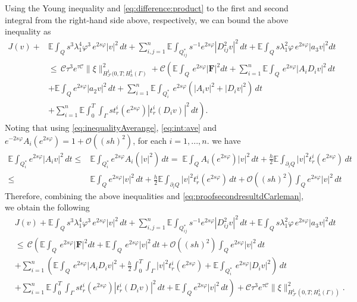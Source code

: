 \documentclass[11pt,oneside,leqno]{amsart}
\numberwithin{equation}{section}
\numberwithin{equation}{section}
\newcommand{\E}{\mathbb{E}}
\begin{document}
Using the Young inequality and \eqref{eq:difference:product} to the first and second integral from the right-hand side above, respectively, we can bound the above inequality as
\begin{equation}\label{eq:proofsecondresultdCarleman}
\begin{split}
J(v)+&\E\int_{Q}s^{3}\lambda^{4}_{1}\varphi^{3}\,e^{2s\varphi}|v|^{2}\,dt+\sum_{i,j=1}^{n}\E\int_{Q_{ij}^{\ast}}s^{-1}e^{2s\varphi}|D_{ij}^2v|^2\, dt+\E\int_{Q}s\lambda_{1}^2\varphi\,e^{2s\varphi}|a_3 v|^2dt\\
&\leq\,\mathcal{C}\tau^3e^{\tau\mathcal{C}}\|\xi\|^2_{H^1_{\mathcal{F}}(0,T;H_h^1(\Gamma)}+\mathcal{C}\left(\E\int_{Q}\,e^{2s\varphi}|\mathbf{F}|^2dt+\sum_{i=1}^{n}\E\int_{Q}\,e^{2s\varphi}|A_{i}D_{i}v|^2\,dt\right.\\
&\left.+\E\int_{Q}e^{2s\varphi}|a_2v|^2\,dt+\sum_{i=1}^{n}\E\int_{Q_i^{\ast}}\,e^{2s\varphi}\left(|A_{i}v|^2+|D_{i}v|^2\right)\,dt\right.\\
&\left.+\sum_{i=1}^{n}\E\int_0^T\int_{\Gamma}st_{r}^{i}(e^{2s\varphi})|t_{r}^{i}(D_iv)|^2\,dt\right).
\end{split}
\end{equation}
Noting that using \eqref{eq:inequalityAverange}, \eqref{eq:int:ave} and $e^{-2s\varphi}A_i(e^{2s\varphi})=1+\mathcal{O}((sh)^2)$, for each $i{ =1,...,n.}$ we have
\begin{equation*}
\begin{split}
\E\int_{Q_i^{\ast}}e^{2s\varphi}|A_{i}v|^2\,dt\leq& \E\int_{Q_i^{\ast}}e^{2s\varphi}A_i(|v|^2)\,dt=\; \E\int_{Q}A_i(e^{2s\varphi})|v|^2\,dt+\frac{h}{2}\E\int_{\partial_i Q} |v|^2t_r^{i}(e^{2s\varphi})\,dt\\
\leq&\E\int_{Q}e^{2s\varphi}|v|^2\,dt+\frac{h}{2}\E\int_{\partial_i Q} |v|^2t_r^{i}(e^{2s\varphi})\,dt+\mathcal{O}((sh)^2)\int_{Q}e^{2s\varphi}|v|^2\,dt
\end{split}
\end{equation*}
Therefore, combining the above inequalities and \eqref{eq:proofsecondresultdCarleman}, we obtain the following  
\begin{equation*}
\begin{split}
&J(v)+\E\int_{Q}s^{3}\lambda^{4}_{1}\varphi^{3}\,e^{2s\varphi}|v|^{2}\,dt+\sum_{i,j=1}^{n}\E\int_{Q_{ij}^{\ast}}s^{-1}e^{2s\varphi}|D_{ij}^2v|^2\, dt+\E\int_{Q}s\lambda_{1}^2\varphi\,e^{2s\varphi}|a_3 v|^2dt\\
&\leq\,\mathcal{C}\left(\E\int_{Q}\,e^{2s\varphi}|\mathbf{F}|^2dt+\E\int_{Q}\,e^{2s\varphi}|v|^2\,dt+\mathcal{O}((sh)^2)\int_{Q}e^{2s\varphi}|v|^2\,dt\right.\\
&+\sum_{i=1}^{n}\left(\E\int_{Q}\,e^{2s\varphi}|A_{i}D_{i}v|^2
+\frac{h}{2}\int_0^T\int_{\Gamma} |v|^2t_r^{i}(e^{2s\varphi})+\E\int_{Q_i^{\ast}}\,e^{2s\varphi}|D_{i}v|^2\right)\,dt\\
&\left.+\sum_{i=1}^{n}\E\int_0^T\int_{\Gamma}st_{r}^{i}(e^{2s\varphi})|t_{r}^{i}(D_iv)|^2\,dt+\E\int_{Q}e^{2s\varphi}|v|^2\,dt\right)+\mathcal{C}\tau^3e^{\tau\mathcal{C}}\|\xi\|^2_{H^1_{\mathcal{F}}(0,T;H_h^1(\Gamma))}.
\end{split}
\end{equation*}
\end{document}
